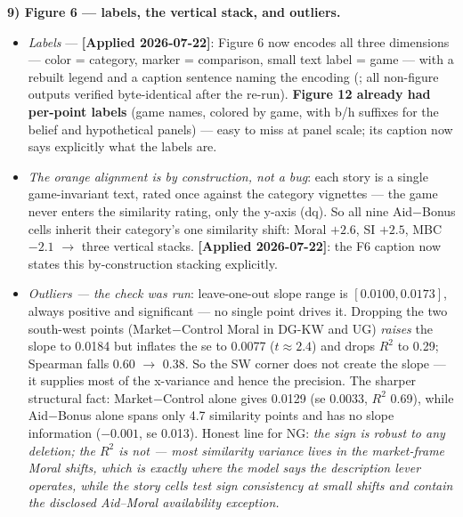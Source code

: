 \documentclass[11pt]{article}
\newcommand{\code}[1]{\path{#1}}
\begin{document}
\textbf{9) Figure 6 --- labels, the vertical stack, and outliers.}
\begin{itemize}
\item \emph{Labels} --- \textbf{[Applied 2026-07-22]}: Figure 6 now encodes all three dimensions --- color = category, marker = comparison, small text label = game --- with a rebuilt legend and a caption sentence naming the encoding (\code{04_analysis.py}; all non-figure outputs verified byte-identical after the re-run). \textbf{Figure 12 already had per-point labels} (game names, colored by game, with b/h suffixes for the belief and hypothetical panels) --- easy to miss at panel scale; its caption now says explicitly what the labels are.
\item \emph{The orange alignment is by construction, not a bug}: each story is a single game-invariant text, rated once against the category vignettes --- the game never enters the similarity rating, only the y-axis (dq). So all nine Aid$-$Bonus cells inherit their category's one similarity shift: Moral $+2.6$, SI $+2.5$, MBC $-2.1$ $\to$ three vertical stacks. \textbf{[Applied 2026-07-22]}: the F6 caption now states this by-construction stacking explicitly.
\item \emph{Outliers --- the check was run}: leave-one-out slope range is $[0.0100, 0.0173]$, always positive and significant --- no single point drives it. Dropping the two south-west points (Market$-$Control Moral in DG-KW and UG) \emph{raises} the slope to 0.0184 but inflates the se to 0.0077 ($t \approx 2.4$) and drops $R^2$ to 0.29; Spearman falls 0.60 $\to$ 0.38. So the SW corner does not create the slope --- it supplies most of the x-variance and hence the precision. The sharper structural fact: Market$-$Control alone gives 0.0129 (se 0.0033, $R^2$ 0.69), while Aid$-$Bonus alone spans only 4.7 similarity points and has no slope information ($-0.001$, se 0.013). Honest line for NG: \emph{the sign is robust to any deletion; the $R^2$ is not --- most similarity variance lives in the market-frame Moral shifts, which is exactly where the model says the description lever operates, while the story cells test sign consistency at small shifts and contain the disclosed Aid--Moral availability exception.}
\end{itemize}
\end{document}
